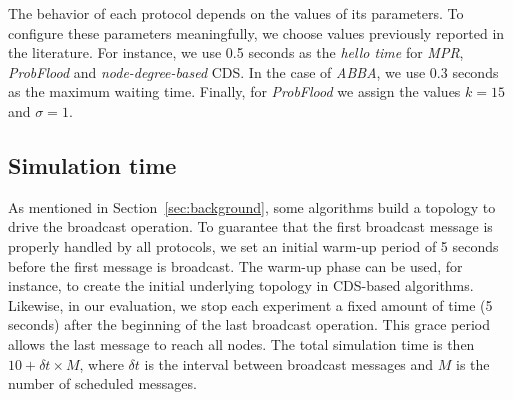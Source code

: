 The behavior of each protocol depends on the values of its parameters.
%
To configure these parameters meaningfully, we choose values previously reported in the literature.
%
For instance, we use 0.5 seconds as the \textit{hello time} for \textit{MPR},  \textit{ProbFlood} and \textit{node-degree-based} CDS.
%
In the case of \textit{ABBA}, we use 0.3 seconds as the maximum waiting time.
%
Finally, for \textit{ProbFlood} we assign the values $k=15$ and $\sigma=1$.


\subsection*{Simulation time}

As mentioned in Section~\ref{sec:background}, some algorithms build a topology to drive the broadcast operation.
%
To guarantee that the first broadcast message is properly handled by all protocols, we set an initial warm-up period of 5 seconds before the first message is broadcast.
The warm-up phase can be used, for instance, to create the initial underlying topology in CDS-based algorithms.
%
Likewise, in our evaluation, we stop each experiment a fixed amount of time (5 seconds) after the beginning of the last broadcast operation.
%
This grace period allows the last message to reach all nodes.
%
The total simulation time is then $10 + {\delta t} \times M$, where ${\delta t}$ is the interval between broadcast messages and $M$ is the number of scheduled messages.






 




